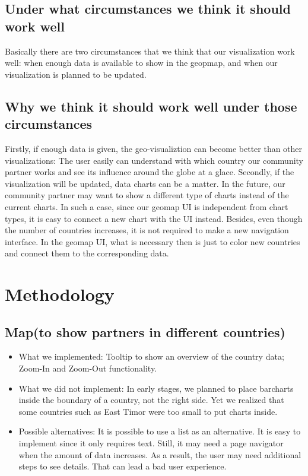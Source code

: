 \documentclass[a4paper]{article}
\begin{document}
\subsection{Under what circumstances we think it should work well}
Basically there are two circumstances that we think that our visualization work well: when enough data is available to show in the geopmap, and when our visualization is planned to be updated.
\subsection{Why we think it should work well under those circumstances}
Firstly, if enough data is given, the geo-visualiztion can become better than other visualizations: The user easily can understand with which country our community partner works and see its influence around the globe at a glace. Secondly, if the visualization will be updated, data charts can be a matter. In the future, our community partner may want to show a different type of charts instead of the current charts. In such a case, since our geomap UI is independent from chart types, it is easy to connect a new chart with the UI instead. Besides, even though the number of countries increases, it is not required to make a new navigation interface. In the geomap UI, what is necessary then is just to color new countries and connect them to the corresponding data.

\section{Methodology}
\subsection{Map(to show partners in different countries)}
\begin{itemize}
\item What we implemented:
Tooltip to show an overview of the country data; Zoom-In and Zoom-Out functionality.\\
\item What we did not implement: 
In early stages, we planned to place barcharts inside the boundary of a country, not the right side. Yet we realized that some countries such as East Timor were too small to put charts inside.\\
\item Possible alternatives:
It is possible to use a list as an alternative. It is easy to implement since it only requires text. Still, it may need a page navigator when the amount of data increases. As a result, the user may need additional steps to see details. That can lead a bad user experience.
\end{itemize}
\end{document}
